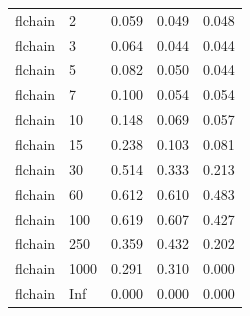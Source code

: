 \begin{tabular}{lllll}
  flchain & 2 & 0.059 & 0.049 & 0.048 \\ 
  flchain & 3 & 0.064 & 0.044 & 0.044 \\ 
  flchain & 5 & 0.082 & 0.050 & 0.044 \\ 
  flchain & 7 & 0.100 & 0.054 & 0.054 \\ 
  flchain & 10 & 0.148 & 0.069 & 0.057 \\ 
  flchain & 15 & 0.238 & 0.103 & 0.081 \\ 
  flchain & 30 & 0.514 & 0.333 & 0.213 \\ 
  flchain & 60 & 0.612 & 0.610 & 0.483 \\ 
  flchain & 100 & 0.619 & 0.607 & 0.427 \\ 
  flchain & 250 & 0.359 & 0.432 & 0.202 \\ 
  flchain & 1000 & 0.291 & 0.310 & 0.000 \\ 
  flchain & Inf & 0.000 & 0.000 & 0.000 \\ 
   \bottomrule
\end{tabular}
